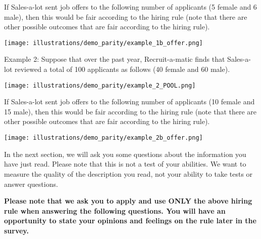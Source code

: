 \documentclass{article}
\begin{document}
If Sales-a-lot sent job offers to the following number of applicants (5 female and 6 male), then this would be fair according to the hiring rule (note that there are other possible outcomes that are fair according to the hiring rule).

\texttt{[image: illustrations/demo\_parity/example\_1b\_offer.png]}

Example 2: Suppose that over the past year, Recruit-a-matic finds that Sales-a-lot reviewed a total of 100 applicants as follows (40 female and 60 male).

\texttt{[image: illustrations/demo\_parity/example\_2\_POOL.png]}

If Sales-a-lot sent job offers to the following number of applicants (10 female and 15 male), then this would be fair according to the hiring rule (note that there are other possible outcomes that are fair according to the hiring rule).

\texttt{[image: illustrations/demo\_parity/example\_2b\_offer.png]}

In the next section, we will ask you some questions about the information you have just read. Please note that this is not a test of your abilities. We want to measure the quality of the description you read, not your ability to take tests or answer questions.

\textbf{Please note that we ask you to apply and use ONLY the above hiring rule when answering the following questions. You will have an opportunity to state your opinions and feelings on the rule later in the survey.}
\end{document}
